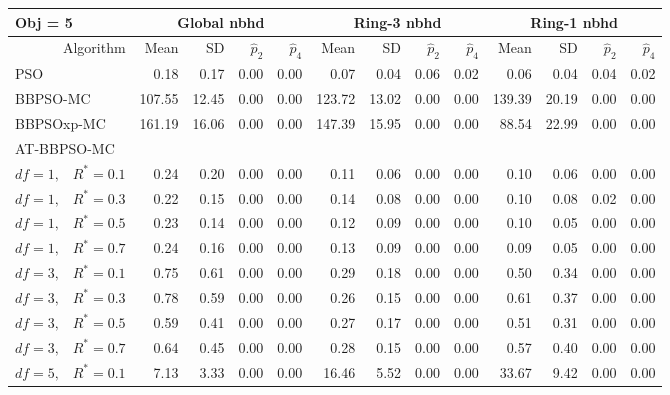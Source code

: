 \documentclass[12pt]{article}
\begin{document}
\begin{appendix}
\begin{table}[ht]
\label{tab:psosim4}
\end{table}
\begin{table}[ht]
\centering
\footnotesize{
\begin{tabular}{r|rrrr|rrrr|rrrr}
\multicolumn{1}{l}{Obj = 5} & \multicolumn{4}{c}{Global nbhd} & \multicolumn{4}{c}{Ring-3 nbhd} & \multicolumn{4}{c}{Ring-1 nbhd}\\
  \hline
Algorithm & Mean & SD & $\widehat{p}_2$ & $\widehat{p}_4$ & Mean & SD & $\widehat{p}_2$ & $\widehat{p}_4$ & Mean & SD & $\widehat{p}_2$ & $\widehat{p}_4$ \\ 
  \hline
\multicolumn{1}{l|}{PSO} & 0.18 & 0.17 & 0.00 & 0.00 & 0.07 & 0.04 & 0.06 & 0.02 & 0.06 & 0.04 & 0.04 & 0.02 \\ 
  \multicolumn{1}{l|}{BBPSO-MC} & 107.55 & 12.45 & 0.00 & 0.00 & 123.72 & 13.02 & 0.00 & 0.00 & 139.39 & 20.19 & 0.00 & 0.00 \\ 
  \multicolumn{1}{l|}{BBPSOxp-MC} & 161.19 & 16.06 & 0.00 & 0.00 & 147.39 & 15.95 & 0.00 & 0.00 & 88.54 & 22.99 & 0.00 & 0.00 \\ 
\hline
\multicolumn{1}{l|}{AT-BBPSO-MC} &&&&&&&&&&&&\\
  $df = 1,\enspace$ $R^* =0.1$ & 0.24 & 0.20 & 0.00 & 0.00 & 0.11 & 0.06 & 0.00 & 0.00 & 0.10 & 0.06 & 0.00 & 0.00 \\ 
  $df = 1,\enspace$ $R^* =0.3$ & 0.22 & 0.15 & 0.00 & 0.00 & 0.14 & 0.08 & 0.00 & 0.00 & 0.10 & 0.08 & 0.02 & 0.00 \\ 
  $df = 1,\enspace$ $R^* =0.5$ & 0.23 & 0.14 & 0.00 & 0.00 & 0.12 & 0.09 & 0.00 & 0.00 & 0.10 & 0.05 & 0.00 & 0.00 \\ 
  $df = 1,\enspace$ $R^* =0.7$ & 0.24 & 0.16 & 0.00 & 0.00 & 0.13 & 0.09 & 0.00 & 0.00 & 0.09 & 0.05 & 0.00 & 0.00 \\ 
  $df = 3,\enspace$ $R^* =0.1$ & 0.75 & 0.61 & 0.00 & 0.00 & 0.29 & 0.18 & 0.00 & 0.00 & 0.50 & 0.34 & 0.00 & 0.00 \\ 
  $df = 3,\enspace$ $R^* =0.3$ & 0.78 & 0.59 & 0.00 & 0.00 & 0.26 & 0.15 & 0.00 & 0.00 & 0.61 & 0.37 & 0.00 & 0.00 \\ 
  $df = 3,\enspace$ $R^* =0.5$ & 0.59 & 0.41 & 0.00 & 0.00 & 0.27 & 0.17 & 0.00 & 0.00 & 0.51 & 0.31 & 0.00 & 0.00 \\ 
  $df = 3,\enspace$ $R^* =0.7$ & 0.64 & 0.45 & 0.00 & 0.00 & 0.28 & 0.15 & 0.00 & 0.00 & 0.57 & 0.40 & 0.00 & 0.00 \\ 
  $df = 5,\enspace$ $R^* =0.1$ & 7.13 & 3.33 & 0.00 & 0.00 & 16.46 & 5.52 & 0.00 & 0.00 & 33.67 & 9.42 & 0.00 & 0.00 \\ 

\end{tabular}}
\end{table}
\end{appendix}
\end{document}
